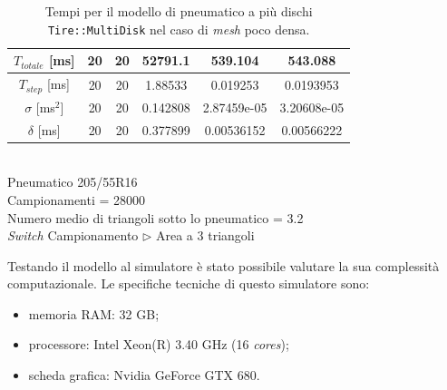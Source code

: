 \begin{table}
\begin{tabular}{c|c|c|c|c|c|}
		\multicolumn{1}{|c|}{$T_{totale}$ [ms]} & 20 & 20 & 52791.1 & 539.104 & 543.088 \\ 
		\hline 
		\multicolumn{1}{|c|}{$T_{step}$ [ms]} & 20 & 20 & 1.88533 & 0.019253 & 0.0193953 \\ 
		\hline 
		\multicolumn{1}{|c|}{$\sigma$ [ms$^2$]} & 20 & 20 & 0.142808 & 2.87459e-05 & 3.20608e-05 \\ 
		\hline 
		\multicolumn{1}{|c|}{$\delta$ [ms]} & 20 & 20 & 0.377899 & 0.00536152 & 0.00566222 \\ 
		\hline
	\end{tabular}
	\\[0.5cm]
	Pneumatico 205/55R16\\
	Campionamenti = 28000\\
	Numero medio di triangoli sotto lo pneumatico = 3.2\\
	\textit{Switch} Campionamento $\triangleright$ Area a 3 triangoli
	\caption{Tempi per il modello di pneumatico a più dischi \texttt{Tire::MultiDisk} nel caso di \textit{mesh} poco densa.}
	\label{MDpiano}
\end{table}
%
\clearpage
\noindent
Testando il modello al simulatore è stato possibile valutare la sua complessità computazionale. Le specifiche tecniche di questo simulatore sono:
\begin{itemize}
	\item memoria RAM: 32 GB;
	\item processore: Intel Xeon(R) 3.40 GHz (16 \textit{cores});
	\item scheda grafica: Nvidia GeForce GTX 680.
\end{itemize}
